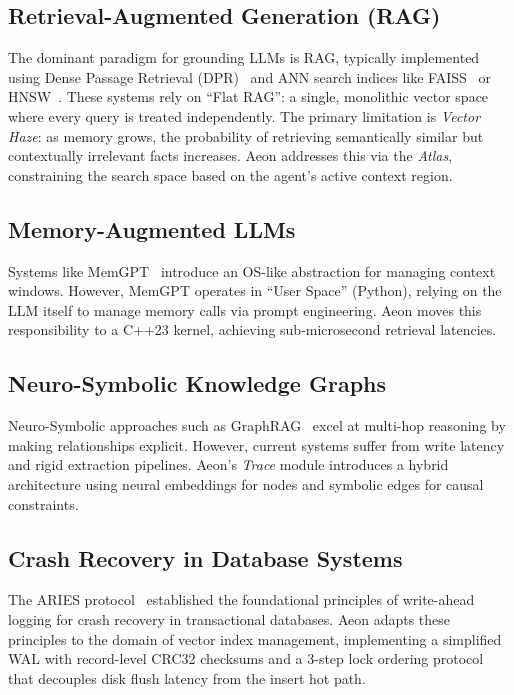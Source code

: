 \documentclass[10pt,twocolumn]{article}
\begin{document}
\subsection{Retrieval-Augmented Generation (RAG)}
The dominant paradigm for grounding LLMs is RAG, typically implemented using Dense Passage Retrieval (DPR)~\cite{karpukhin2020dense} and ANN search indices like FAISS~\cite{faiss2017} or HNSW~\cite{malkov2018hnsw}. These systems rely on ``Flat RAG'': a single, monolithic vector space where every query is treated independently. The primary limitation is \textit{Vector Haze}: as memory grows, the probability of retrieving semantically similar but contextually irrelevant facts increases. Aeon addresses this via the \textit{Atlas}, constraining the search space based on the agent's active context region.

\subsection{Memory-Augmented LLMs}
Systems like MemGPT~\cite{memgpt2023} introduce an OS-like abstraction for managing context windows. However, MemGPT operates in ``User Space'' (Python), relying on the LLM itself to manage memory calls via prompt engineering. Aeon moves this responsibility to a C++23 kernel, achieving sub-microsecond retrieval latencies.

\subsection{Neuro-Symbolic Knowledge Graphs}
Neuro-Symbolic approaches such as GraphRAG~\cite{edge2024graphrag} excel at multi-hop reasoning by making relationships explicit. However, current systems suffer from write latency and rigid extraction pipelines. Aeon's \textit{Trace} module introduces a hybrid architecture using neural embeddings for nodes and symbolic edges for causal constraints.

\subsection{Crash Recovery in Database Systems}
The ARIES protocol~\cite{mohan1992aries} established the foundational principles of write-ahead logging for crash recovery in transactional databases. Aeon adapts these principles to the domain of vector index management, implementing a simplified WAL with record-level CRC32 checksums and a 3-step lock ordering protocol that decouples disk flush latency from the insert hot path.
\end{document}
